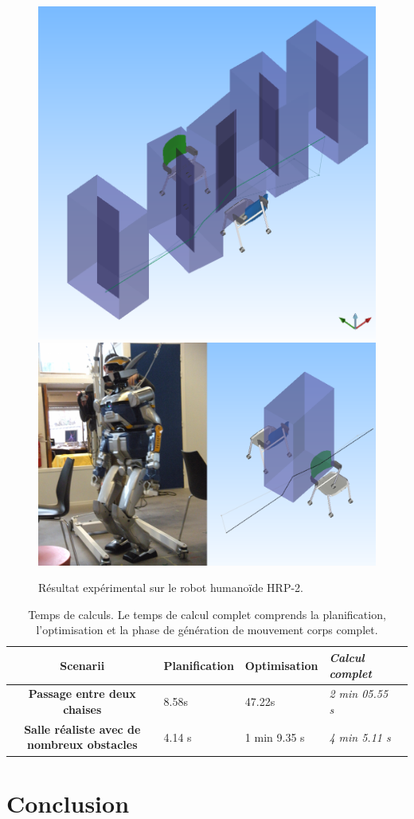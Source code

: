 \begin{figure}[htbp]
  \begin{center}
    \includegraphics[width=.45\linewidth]{src/chap1-roboptim/two-chairs.png}
    \includegraphics[width=.45\linewidth]{src/chap1-roboptim/hrp2-two-chairs.png}
  \end{center}
 \caption{Résultat expérimental sur le robot humanoïde
   HRP-2. \label{fig:results}}
\end{figure}

\begin{table}
  \begin{center}
    \begin{tabular}{|c|l l l|l|}
      \hline \bf Scenarii & Planification & Optimisation &
      \emph{Calcul complet}\\ \hline \bf Passage entre deux chaises &
      8.58s & 47.22s & \emph{2 min 05.55 s}\\ \hline \bf Salle
      réaliste avec de nombreux obstacles & 4.14 s & 1 min 9.35 s &
      \emph{4 min 5.11 s}\\ \hline
    \end{tabular}
  \end{center}
  \caption{Temps de calculs. Le temps de calcul complet comprends la
    planification, l'optimisation et la phase de génération de
    mouvement corps complet.\label{tab:benchmarks}}
\end{table}


\section{Conclusion}
\label{sec:chap1_conclusion}

